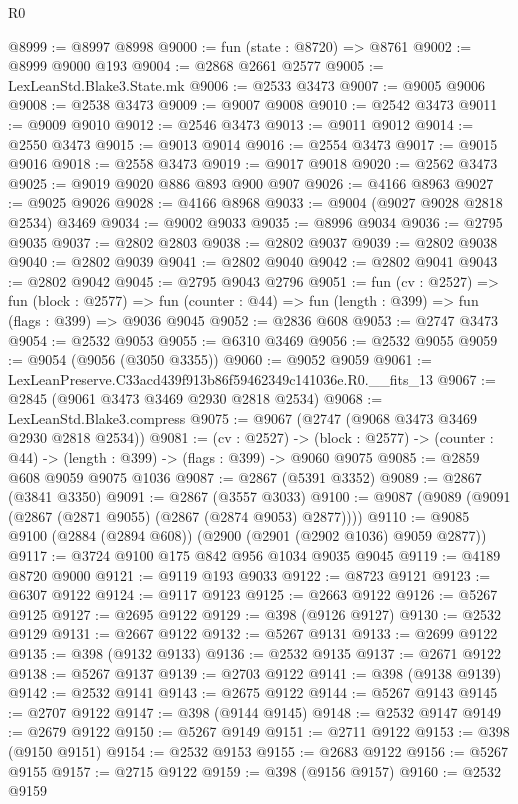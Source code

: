 \begin{lexlean}{R0}
\begin{coremodule}
@8999 := @8997 @8998
@9000 := fun (state : @8720) => @8761
@9002 := @8999 @9000 @193
@9004 := @2868 @2661 @2577
@9005 := LexLeanStd.Blake3.State.mk
@9006 := @2533 @3473
@9007 := @9005 @9006
@9008 := @2538 @3473
@9009 := @9007 @9008
@9010 := @2542 @3473
@9011 := @9009 @9010
@9012 := @2546 @3473
@9013 := @9011 @9012
@9014 := @2550 @3473
@9015 := @9013 @9014
@9016 := @2554 @3473
@9017 := @9015 @9016
@9018 := @2558 @3473
@9019 := @9017 @9018
@9020 := @2562 @3473
@9025 := @9019 @9020 @886 @893 @900 @907
@9026 := @4166 @8963
@9027 := @9025 @9026
@9028 := @4166 @8968
@9033 := @9004 (@9027 @9028 @2818 @2534) @3469
@9034 := @9002 @9033
@9035 := @8996 @9034
@9036 := @2795 @9035
@9037 := @2802 @2803
@9038 := @2802 @9037
@9039 := @2802 @9038
@9040 := @2802 @9039
@9041 := @2802 @9040
@9042 := @2802 @9041
@9043 := @2802 @9042
@9045 := @2795 @9043 @2796
@9051 := fun (cv : @2527) =>
  fun (block : @2577) =>
  fun (counter : @44) => fun (length : @399) => fun (flags : @399) => @9036 @9045
@9052 := @2836 @608
@9053 := @2747 @3473
@9054 := @2532 @9053
@9055 := @6310 @3469
@9056 := @2532 @9055
@9059 := @9054 (@9056 (@3050 @3355))
@9060 := @9052 @9059
@9061 := LexLeanPreserve.C33acd439f913b86f59462349c141036e.R0.__fits_13
@9067 := @2845 (@9061 @3473 @3469 @2930 @2818 @2534)
@9068 := LexLeanStd.Blake3.compress
@9075 := @9067 (@2747 (@9068 @3473 @3469 @2930 @2818 @2534))
@9081 := (cv : @2527) ->
  (block : @2577) -> (counter : @44) -> (length : @399) -> (flags : @399) -> @9060 @9075
@9085 := @2859 @608 @9059 @9075 @1036
@9087 := @2867 (@5391 @3352)
@9089 := @2867 (@3841 @3350)
@9091 := @2867 (@3557 @3033)
@9100 := @9087 (@9089 (@9091 (@2867 (@2871 @9055) (@2867 (@2874 @9053) @2877))))
@9110 := @9085 @9100 (@2884 (@2894 @608)) (@2900 (@2901 (@2902 @1036) @9059 @2877))
@9117 := @3724 @9100 @175 @842 @956 @1034 @9035 @9045
@9119 := @4189 @8720 @9000
@9121 := @9119 @193 @9033
@9122 := @8723 @9121
@9123 := @6307 @9122
@9124 := @9117 @9123
@9125 := @2663 @9122
@9126 := @5267 @9125
@9127 := @2695 @9122
@9129 := @398 (@9126 @9127)
@9130 := @2532 @9129
@9131 := @2667 @9122
@9132 := @5267 @9131
@9133 := @2699 @9122
@9135 := @398 (@9132 @9133)
@9136 := @2532 @9135
@9137 := @2671 @9122
@9138 := @5267 @9137
@9139 := @2703 @9122
@9141 := @398 (@9138 @9139)
@9142 := @2532 @9141
@9143 := @2675 @9122
@9144 := @5267 @9143
@9145 := @2707 @9122
@9147 := @398 (@9144 @9145)
@9148 := @2532 @9147
@9149 := @2679 @9122
@9150 := @5267 @9149
@9151 := @2711 @9122
@9153 := @398 (@9150 @9151)
@9154 := @2532 @9153
@9155 := @2683 @9122
@9156 := @5267 @9155
@9157 := @2715 @9122
@9159 := @398 (@9156 @9157)
@9160 := @2532 @9159

\end{coremodule}
\end{lexlean}
